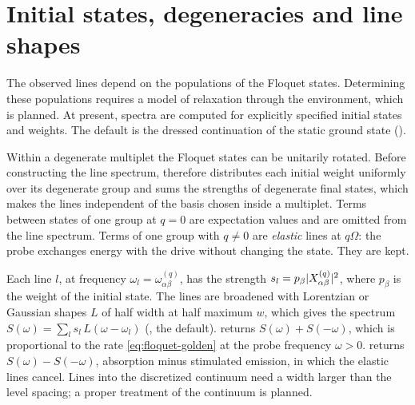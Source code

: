 \section{Initial states, degeneracies and line shapes}

The observed lines depend on the populations of the Floquet states. Determining these
populations requires a model of relaxation through the environment, which is planned.
At present, spectra are computed for explicitly specified initial states and weights. The default
is the dressed continuation of the static ground state ().

Within a degenerate multiplet the Floquet states can be unitarily rotated. Before constructing
the line spectrum, \pkg{} therefore distributes each initial weight uniformly over its degenerate group and
sums the strengths of degenerate final states, which makes the lines independent of the
basis chosen inside a multiplet. Terms between states of one group at $q=0$ are expectation
values and are omitted from the line spectrum. Terms of one group with $q\ne0$ are \emph{elastic}
lines at $q\Omega$: the probe exchanges energy with the drive without changing the state.
They are kept.

Each line $l$, at frequency $\omega_l=\omega^{(q)}_{\alpha\beta}$, has the strength
$s_l=p_\beta\lvert X^{(q)}_{\alpha\beta}\rvert^2$, where $p_\beta$ is the weight of the initial state.
The lines are broadened with Lorentzian or Gaussian shapes $L$ of half width at half maximum
$w$, which gives the spectrum $S(\omega)=\sum_ls_l\,L(\omega-\omega_l)$
(, the default).  returns $S(\omega)+S(-\omega)$,
which is proportional to the rate \eqref{eq:floquet-golden} at the probe frequency
$\omega>0$.  returns $S(\omega)-S(-\omega)$, absorption minus stimulated
emission, in which the elastic lines cancel. Lines into the discretized continuum need a
width larger than the level spacing; a proper treatment of the continuum is planned.

